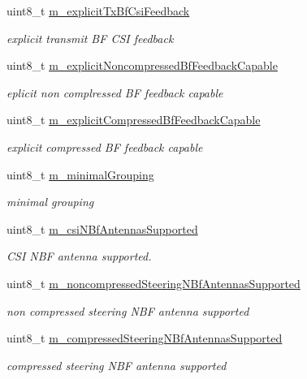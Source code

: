 \begin{DoxyCompactItemize}
uint8\+\_\+t \hyperlink{classns3_1_1HtCapabilities_a6bb0b4be191cae387ee80569df6b376b}{m\+\_\+explicit\+Tx\+Bf\+Csi\+Feedback}
\begin{DoxyCompactList}\small\item\em explicit transmit BF C\+SI feedback \end{DoxyCompactList}\item 
uint8\+\_\+t \hyperlink{classns3_1_1HtCapabilities_a938d861ca3d9167c3beff00c2664098b}{m\+\_\+explicit\+Noncompressed\+Bf\+Feedback\+Capable}
\begin{DoxyCompactList}\small\item\em eplicit non complressed BF feedback capable \end{DoxyCompactList}\item 
uint8\+\_\+t \hyperlink{classns3_1_1HtCapabilities_a1ee805003f1223d7c5bbdd74f63612c8}{m\+\_\+explicit\+Compressed\+Bf\+Feedback\+Capable}
\begin{DoxyCompactList}\small\item\em explicit compressed BF feedback capable \end{DoxyCompactList}\item 
uint8\+\_\+t \hyperlink{classns3_1_1HtCapabilities_a5084a740132ff1756aefc28e022e4481}{m\+\_\+minimal\+Grouping}
\begin{DoxyCompactList}\small\item\em minimal grouping \end{DoxyCompactList}\item 
uint8\+\_\+t \hyperlink{classns3_1_1HtCapabilities_abd07898fcf99ad67706ba00724cd2cd6}{m\+\_\+csi\+N\+Bf\+Antennas\+Supported}
\begin{DoxyCompactList}\small\item\em C\+SI N\+BF antenna supported. \end{DoxyCompactList}\item 
uint8\+\_\+t \hyperlink{classns3_1_1HtCapabilities_ae7be4921a53fffad597527cc2b1fceac}{m\+\_\+noncompressed\+Steering\+N\+Bf\+Antennas\+Supported}
\begin{DoxyCompactList}\small\item\em non compressed steering N\+BF antenna supported \end{DoxyCompactList}\item 
uint8\+\_\+t \hyperlink{classns3_1_1HtCapabilities_a20ab9f5b04a077d45eb8182aef0691ef}{m\+\_\+compressed\+Steering\+N\+Bf\+Antennas\+Supported}
\begin{DoxyCompactList}\small\item\em compressed steering N\+BF antenna supported \end{DoxyCompactList}\item 

\end{DoxyCompactItemize}
